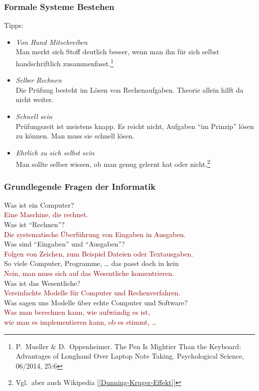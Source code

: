 \documentclass[onlymath]{beamer}
\begin{document}
\begin{frame}\frametitle{Formale Systeme Bestehen}
Tipps:
\begin{itemize}
\item \emph{Von Hand Mitschreiben}\\
	{\footnotesize Man merkt sich Stoff deutlich besser, wenn man ihn für sich selbst handschriftlich
	zusammenfasst.\footnote{\tiny P.\ Mueller \& D.\ Oppenheimer. The Pen Is Mightier Than the Keyboard: Advantages of Longhand Over Laptop Note Taking. Psychological Science, 06/2014, 25:6}}
\item \emph{Selber Rechnen}\\
	{\footnotesize Die Prüfung besteht im Lösen von Rechenaufgaben. Theorie allein hilft da nicht weiter.}
\item \emph{Schnell sein}\\
	{\footnotesize Prüfungszeit ist meistens knapp. Es reicht nicht, Aufgaben "`im Prinzip"' lösen zu können. Man muss sie schnell lösen.}
\item \emph{Ehrlich zu sich selbst sein}\\
	{\footnotesize Man sollte selber wissen, ob man genug gelernt hat oder nicht.\footnote{\tiny Vgl.\ aber auch Wikipedia \href{https://de.wikipedia.org/wiki/Dunning-Kruger-Effekt}{[[Dunning-Kruger-Effekt]]}}}
\end{itemize}

\end{frame}



\newcommand{\qaline}[2]{\alert{#1}\\\hfill \textcolor{darkred}{#2}\\[1.5ex]}

\begin{frame}\frametitle{Grundlegende Fragen der Informatik}

\qaline{Was ist ein Computer?}{Eine Maschine, die rechnet.}

\qaline{Was ist "`Rechnen"'?}{Die systematische Überführung von Eingaben in Ausgaben.}

\qaline{Was sind "`Eingaben"' und "`Ausgaben"'?}{Folgen von Zeichen, zum Beispiel Dateien oder Textausgaben.}

\qaline{So viele Computer, Programme, \ldots{} das passt doch in kein \ghost{Studium!}}{Nein, man muss sich auf das Wesentliche konzentrieren.}

\qaline{Was ist das Wesentliche?}{Vereinfachte Modelle für Computer und Rechenverfahren.}

\qaline{Was sagen uns Modelle über echte Computer und Software?}{Was man berechnen kann, wie aufwändig es ist,\\\hfill wie man es implementieren kann, ob es stimmt, \ldots}

\end{frame}
\end{document}
